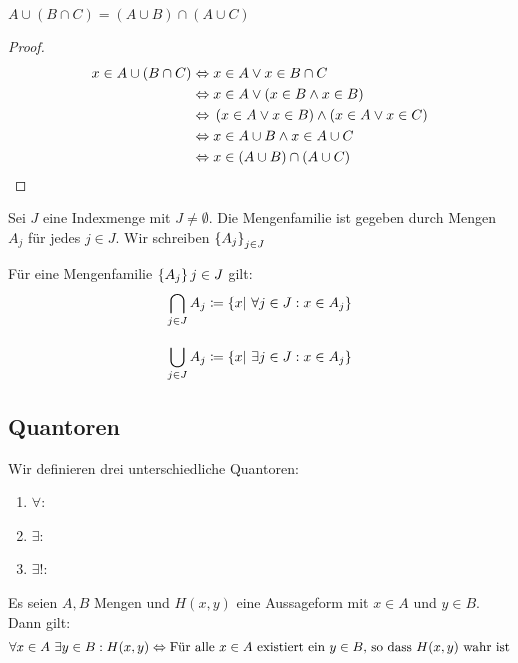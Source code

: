 \begin{lemma}
    $A\cup (B \cap C) = (A\cup B) \cap (A\cup C)$
    \begin{proof}
        \begin{align*}
            x\in A \cup \left(B \cap C\right) &\Leftrightarrow{} x\in A \lor x\in B \cap C\\
            &\Leftrightarrow{} x\in A \lor \left(x\in B \land x \in B\right)\\
            &\Leftrightarrow{} \left(x\in A \lor x\in B\right)\land\left(x\in A \lor x\in C\right)\\
            &\Leftrightarrow{} x\in A \cup B\land x \in A \cup C\\
            &\Leftrightarrow{} x\in \left(A \cup B\right)\cap\left(A\cup C\right)\qedhere
        \end{align*}
    \end{proof}
\end{lemma}

\begin{definition}
    Sei $J$ eine Indexmenge mit $J\neq \emptyset$. Die Mengenfamilie ist gegeben durch Mengen $A_{j}$ für jedes $j\in J$. Wir schreiben $\left\{A_j\right\}_{j\in J}$
\end{definition}

\begin{definition}
    Für eine Mengenfamilie $\left\{A_j\right\}j\in J$ gilt:
    \begin{align*}
        \bigcap_{j\in J} A_j &\coloneqq \left\{x|~\forall j\in J: x\in A_j\right\}\\[10pt]
        \bigcup_{j\in J} A_j &\coloneqq \left\{x|~\exists j\in J: x\in A_j\right\}
    \end{align*}
\end{definition}

\newpage

\subsection{Quantoren}

\begin{definition}[Quantoren]
    Wir definieren drei unterschiedliche Quantoren:
    \theoremescape
    \begin{enumerate}[label=(\roman*)]
        \item $\forall$: 
        \item $\exists$: 
        \item $\exists!$: 
    \end{enumerate}
    \vspace{0.2cm}
    Es seien $A,B$ Mengen und $H(x,y)$ eine Aussageform mit $x\in A$ und $y \in B$. Dann gilt:
    \begin{align*}
        \forall x \in A~\exists y \in B: H(x,y) \Leftrightarrow{} \text{Für alle $x\in A$ existiert ein $y \in B$, so dass $H(x,y)$ wahr ist}
    \end{align*}
\end{definition}
\vspace{0.2cm}

